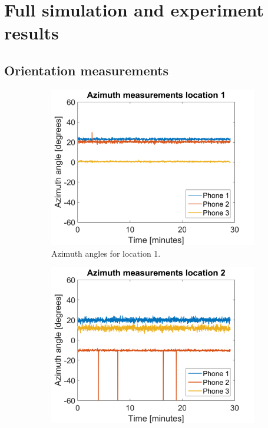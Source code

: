\documentclass[a4paper, notitlepage]{report}
\begin{document}
\lhead{\fancyplain{}{\textsf{\nouppercase{\leftmark}}}} %

\appendix
\renewcommand{\thechapter}{\Alph{chapter}}
\renewcommand{\thesection}{\Roman{section}}
\chapter{Full simulation and experiment results}
\label{app:results}
\vspace{-35pt}
\section{Orientation measurements}
\begin{figure}[H]
\begin{adjustwidth}{-1in}{-1in}
\centering
	\begin{subfigure}{0.33\textwidth}
		\includegraphics[width=\textwidth]{figures/orientation/az_loc1}
		\caption{Azimuth angles for location 1.}
		\label{app:orientation_az_loc1}
	\end{subfigure}
	\begin{subfigure}{0.33\textwidth}
		\includegraphics[width=\textwidth]{figures/orientation/az_loc2}

\end{subfigure}
\end{adjustwidth}
\end{figure}
\end{document}

